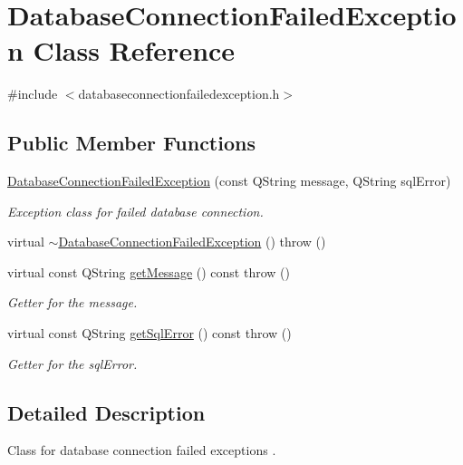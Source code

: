 \hypertarget{classDatabaseConnectionFailedException}{
\section{\-Database\-Connection\-Failed\-Exception \-Class \-Reference}
\label{d3/d31/classDatabaseConnectionFailedException}
}


{\ttfamily \#include $<$databaseconnectionfailedexception.\-h$>$}

\subsection*{\-Public \-Member \-Functions}
\begin{DoxyCompactItemize}
\item 
\hyperlink{classDatabaseConnectionFailedException_a784aba557a81691eca0ae32e1a6ea6c4}{\-Database\-Connection\-Failed\-Exception} (const \-Q\-String message, \-Q\-String sql\-Error)
\begin{DoxyCompactList}\small\item\em \-Exception class for failed database connection. \end{DoxyCompactList}\item 
virtual \hyperlink{classDatabaseConnectionFailedException_a666c5d590533b48f3a4bd8df0e98f86b}{$\sim$\-Database\-Connection\-Failed\-Exception} ()  throw ()
\item 
virtual const \-Q\-String \hyperlink{classDatabaseConnectionFailedException_a6e06c3e2211fd467dee77cc8a0f32916}{get\-Message} () const   throw ()
\begin{DoxyCompactList}\small\item\em \-Getter for the message. \end{DoxyCompactList}\item 
virtual const \-Q\-String \hyperlink{classDatabaseConnectionFailedException_a468c38c3fc532627e1aea4b8e59c1112}{get\-Sql\-Error} () const   throw ()
\begin{DoxyCompactList}\small\item\em \-Getter for the sql\-Error. \end{DoxyCompactList}\end{DoxyCompactItemize}


\subsection{\-Detailed \-Description}
\-Class for database connection failed exceptions .

